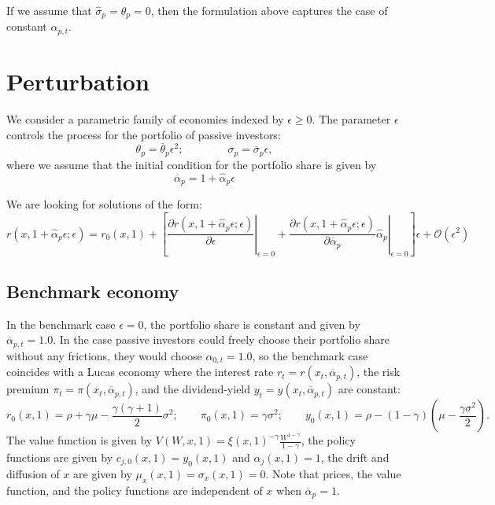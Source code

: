 If we assume that $\hat{\sigma}_p = \theta_p = 0$, then the formulation above captures the case of constant $\alpha_{p,t}$. 


\section{Perturbation}

We consider a parametric family of economies indexed by $\epsilon \geq 0$. The parameter $\epsilon$ controls the process for the portfolio of passive investors:
\begin{equation}
    \theta_p = \overline{\theta}_p \epsilon^2; \qquad \qquad \sigma_p = \overline{\sigma}_p \epsilon,
\end{equation}
where we assume that the initial condition for the portfolio share is given by
\begin{equation}
    \overline{\alpha}_{p} = 1 + \hat{\alpha}_{p} \epsilon
    \end{equation}

We are looking for solutions of the form:
\begin{equation}
r(x, 1+\hat{\alpha}_p \epsilon; \epsilon) = r_0(x,1) + \left[ \left.\frac{\partial r(x,1+\hat{\alpha}_p \epsilon; \epsilon)}{\partial \epsilon}\right|_{\epsilon=0}  +\left. \frac{\partial r (x,1+\hat{\alpha}_p \epsilon; \epsilon)}{\partial \overline{\alpha}_p} \hat{\alpha}_p\right|_{\epsilon=0}  \right] \epsilon + \mathcal{O}(\epsilon^2)
\end{equation}

\subsection{Benchmark economy}

In the benchmark case $\epsilon = 0$, the portfolio share is constant and given by $\overline{\alpha}_{p,t} = 1.0$. In the case passive investors could freely choose their portfolio share without any frictions, they would choose $\alpha_{0,t} = 1.0$, so the benchmark case coincides with a Lucas economy where the interest rate $r_t=r(x_t,\overline{\alpha}_{p,t})$, the risk premium $\pi_t=\pi(x_t, \overline{\alpha}_{p,t})$, and the dividend-yield $y_t = y(x_t,\overline{\alpha}_{p,t})$ are constant:
\begin{equation}
    r_0(x,1) = \rho + \gamma \mu - \frac{\gamma (\gamma+1)}{2} \sigma^2; \qquad \pi_0(x,1) = \gamma \sigma^2; \qquad y_0(x,1) = \rho - (1-\gamma) \left( \mu - \frac{\gamma \sigma^2}{2} \right).
\end{equation}
The value function is given by $V(W,x,1) = \xi(x,1)^{-\gamma} \frac{W^{1-\gamma}}{1-\gamma}$, the policy functions are given by $c_{j,0}(x,1) = y_0(x,1)$ and $\alpha_{j}(x,1) = 1$, the drift and diffusion of $x$ are given by $\mu_x(x,1) = \sigma_{x}(x,1) = 0$. Note that prices, the value function, and the policy functions are independent of $x$ when $\overline{\alpha}_p = 1$.


